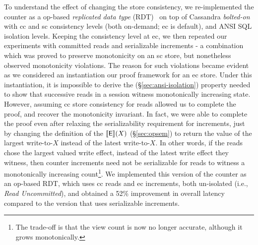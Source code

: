 To understand the effect of changing the store consistency, we
re-implemented the counter as a op-based \emph{replicated data type}
(RDT)~\cite{crdt,burckhardt14} on top of Cassandra
\emph{bolted-on}~\cite{bailisbolton} with {\sc cc} and {\sc sc}
consistency levels (both on-demand; {\sc ec} is default), and ANSI SQL
isolation levels. Keeping the consistency level at {\sc ec}, we then
repeated our experiments with committed reads and serializable
increments - a combination which was proved to preserve monotonicity
on an {\sc sc} store, but nonetheless observed monotonicity
violations. The reason for such violations became evident as we
considered an instantiation our proof framework for an {\sc ec} store.
Under this instantiation, it is impossible to derive the
 (\S\ref{sec:ansi-isolation}) property needed to show
that successive reads in a session witness monotonically increasing
state. However, assuming {\sc cc} store consistency for reads allowed
us to complete the proof, and recover the monotonicity invariant. In
fact, we were able to complete the proof even after relaxing the
serializability requirement for increments, just by changing the
definition of the $\llbracket \textsf{E} \rrbracket(X)$ (\S\ref{sec:opsem}) to return the
value of the largest write-to-$X$ instead of the latest write-to-$X$.
In other words, if the reads chose the largest valued write effect,
instead of the latest write effect they witness, then counter
increments need not be serializable for reads to witness a
monotonically increasing count\footnote{The trade-off is that the view
count is now no longer accurate, although it grows monotonically.}.
We implemented this version of the counter as an op-based RDT, which
uses {\sc cc} reads and {\sc ec} increments, both un-isolated (i.e.,
\emph{Read Uncommitted}), and obtained a 52\% improvement in overall
latency compared to the version that uses serializable increments.

